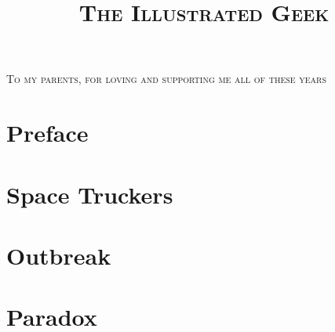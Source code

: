 \documentclass{book}
\title{\vspace{-3.5in} \textsc{The Illustrated Geek}}
\author{}
\date{}
\begin{document}
\frontmatter

\maketitle
\thispagestyle{empty}
\cleardoublepage



\vspace*{1.5in}
\begin{center}
	\large\textsc{To my parents, for loving and supporting me all of these years}
\end{center}
\thispagestyle{empty}
\newpage
\thispagestyle{empty}
\hbox{}

{
\renewcommand{\cleardoublepage}{\clearpage}
\tableofcontents

\chapter{Preface}

}

\mainmatter

\chapter*{Space Truckers}


\chapter*{Outbreak}


% 

\chapter*{Paradox}


\newpage

\backmatter
\end{document}
